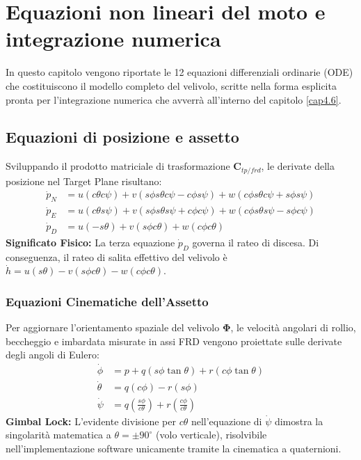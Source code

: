 \chapter{Equazioni non lineari del moto e integrazione numerica}

\vspace{-1.5cm} 
\label{sec:equazioni}
In questo capitolo vengono riportate le 12 equazioni differenziali ordinarie (ODE) che costituiscono il modello completo del velivolo, scritte nella forma esplicita pronta per l'integrazione numerica che  avverrà all'interno del capitolo \ref{cap4.6}.

\section{Equazioni di posizione e assetto}
\label{sec:F16AereoFM}
\label{eqAltitudine}
Sviluppando il prodotto matriciale di trasformazione $\mathbf{C}_{tp/frd}$, le derivate della posizione nel Target Plane risultano:
\begin{align}
	\dot{p}_N &= u(c\theta c\psi) + v(s\phi s\theta c\psi - c\phi s\psi) + w(c\phi s\theta c\psi + s\phi s\psi) \\
	\dot{p}_E &= u(c\theta s\psi) + v(s\phi s\theta s\psi + c\phi c\psi) + w(c\phi s\theta s\psi - s\phi c\psi) \\
	\dot{p}_D &= u(-s\theta) + v(s\phi c\theta) + w(c\phi c\theta)
\end{align}
\textbf{Significato Fisico:} La terza equazione $\dot{p}_D$ governa il rateo di discesa. Di conseguenza, il rateo di salita effettivo del velivolo è $\dot{h} = u(s\theta) - v(s\phi c\theta) - w(c\phi c\theta)$.

\subsection*{Equazioni Cinematiche dell'Assetto }
Per aggiornare l'orientamento spaziale del velivolo $\bm{\Phi}$, le velocità angolari di rollio, beccheggio e imbardata misurate in assi FRD vengono proiettate sulle derivate degli angoli di Eulero:
\begin{align}
	\dot{\phi} &= p + q (s\phi \tan\theta) + r (c\phi \tan\theta) \\
	\dot{\theta} &= q (c\phi) - r (s\phi) \\
	\dot{\psi} &= q \left(\frac{s\phi}{c\theta}\right) + r \left(\frac{c\phi}{c\theta}\right)
\end{align}
\textbf{Gimbal Lock:} L'evidente divisione per $c\theta$ nell'equazione di $\dot{\psi}$ dimostra la singolarità matematica a $\theta = \pm 90^\circ$ (volo verticale), risolvibile nell'implementazione software unicamente tramite la cinematica a quaternioni.
